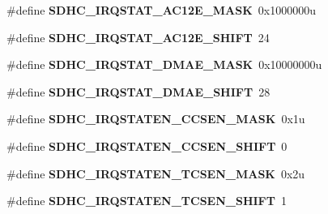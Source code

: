 \begin{DoxyCompactItemize}
\item 
\#define {\bfseries S\+D\+H\+C\+\_\+\+I\+R\+Q\+S\+T\+A\+T\+\_\+\+A\+C12\+E\+\_\+\+M\+A\+SK}~0x1000000u\hypertarget{group__SDHC__Register__Masks_gaa084b3a11c48abfe299e0f4dd5e6522c}{}\label{group__SDHC__Register__Masks_gaa084b3a11c48abfe299e0f4dd5e6522c}

\item 
\#define {\bfseries S\+D\+H\+C\+\_\+\+I\+R\+Q\+S\+T\+A\+T\+\_\+\+A\+C12\+E\+\_\+\+S\+H\+I\+FT}~24\hypertarget{group__SDHC__Register__Masks_gaa438836d215d57b0c6284879f9460161}{}\label{group__SDHC__Register__Masks_gaa438836d215d57b0c6284879f9460161}

\item 
\#define {\bfseries S\+D\+H\+C\+\_\+\+I\+R\+Q\+S\+T\+A\+T\+\_\+\+D\+M\+A\+E\+\_\+\+M\+A\+SK}~0x10000000u\hypertarget{group__SDHC__Register__Masks_gac96246ff1e63bd8572c8e5dbe9f0af38}{}\label{group__SDHC__Register__Masks_gac96246ff1e63bd8572c8e5dbe9f0af38}

\item 
\#define {\bfseries S\+D\+H\+C\+\_\+\+I\+R\+Q\+S\+T\+A\+T\+\_\+\+D\+M\+A\+E\+\_\+\+S\+H\+I\+FT}~28\hypertarget{group__SDHC__Register__Masks_ga00be94aaf735d641b66038501ab81c35}{}\label{group__SDHC__Register__Masks_ga00be94aaf735d641b66038501ab81c35}

\item 
\#define {\bfseries S\+D\+H\+C\+\_\+\+I\+R\+Q\+S\+T\+A\+T\+E\+N\+\_\+\+C\+C\+S\+E\+N\+\_\+\+M\+A\+SK}~0x1u\hypertarget{group__SDHC__Register__Masks_ga1ab5a76edc7d9d1b3458f6e111a47d29}{}\label{group__SDHC__Register__Masks_ga1ab5a76edc7d9d1b3458f6e111a47d29}

\item 
\#define {\bfseries S\+D\+H\+C\+\_\+\+I\+R\+Q\+S\+T\+A\+T\+E\+N\+\_\+\+C\+C\+S\+E\+N\+\_\+\+S\+H\+I\+FT}~0\hypertarget{group__SDHC__Register__Masks_gadbf850c08e3d0acfe9d03da53ac61b52}{}\label{group__SDHC__Register__Masks_gadbf850c08e3d0acfe9d03da53ac61b52}

\item 
\#define {\bfseries S\+D\+H\+C\+\_\+\+I\+R\+Q\+S\+T\+A\+T\+E\+N\+\_\+\+T\+C\+S\+E\+N\+\_\+\+M\+A\+SK}~0x2u\hypertarget{group__SDHC__Register__Masks_gac97f75c248571976edfb322bda13864e}{}\label{group__SDHC__Register__Masks_gac97f75c248571976edfb322bda13864e}

\item 
\#define {\bfseries S\+D\+H\+C\+\_\+\+I\+R\+Q\+S\+T\+A\+T\+E\+N\+\_\+\+T\+C\+S\+E\+N\+\_\+\+S\+H\+I\+FT}~1\hypertarget{group__SDHC__Register__Masks_gae491cb6cce5060d01d37d180b32ac94c}{}\label{group__SDHC__Register__Masks_gae491cb6cce5060d01d37d180b32ac94c}


\end{DoxyCompactItemize}
